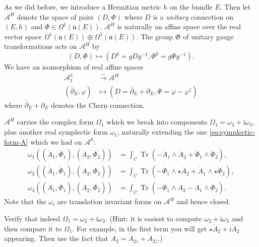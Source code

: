 \documentclass[12pt,letterpaper,reqno]{article}
\numberwithin{equation}{section}
\newcommand{\fu}{{\mathfrak u}}
\newcommand{\fG}{{\mathfrak G}}
\newcommand{\cA}{\ensuremath{\mathcal A}}
\newcommand{\C}{\ensuremath{\mathbb C}}
\newcommand{\I}{{\mathrm i}}
\newcommand{\simarrow}{\xrightarrow\sim}
\newcommand{\ti}[1]{\textit{#1}}
\DeclareMathOperator{\Tr}{Tr}
\begin{document}
As we did before, we introduce a Hermitian metric $h$ on the 
bundle $E$.
Then let $\cA^H$ denote the space
of pairs $(D,\Phi)$ where $D$ is a \ti{unitary} connection on $(E,h)$
and $\Phi \in \Omega^1(\fu(E))$.
$\cA^H$ is naturally an affine space over the real vector space
$\Omega^1(\fu(E)) \oplus \Omega^1(\fu(E))$.
The group $\fG$ of unitary gauge transformations
acts on $\cA^H$ by
\begin{equation}
  (D,\Phi) \mapsto (D^g = g D g^{-1}, \Phi^g = g \Phi g^{-1}).
\end{equation}
We have an isomorphism of real affine spaces
\begin{align}
    \cA^\C_1 &\simarrow \cA^H \\
    (\bar\partial_E,\varphi) & \mapsto (D = \bar\partial_E + \partial_E, \Phi = \varphi - \varphi^\dagger)
\end{align}
where $\bar\partial_E + \partial_E$ denotes the Chern connection.

$\cA^H$ carries the complex form $\Omega_1$ which we break into 
components $\Omega_1 = \omega_2 + \I \omega_3$, plus another 
real symplectic form $\omega_1$, naturally extending the one \eqref{eq:symplectic-form-A} which 
we had on $\cA^h$:
\begin{align}
  \omega_1((\dot A_1, \dot \Phi_1),(\dot A_2, \dot \Phi_2)) &= \int_C \Tr(- \dot A_1 \wedge \dot A_2 + \dot \Phi_1 \wedge \dot \Phi_2), \\
  \omega_2((\dot A_1, \dot \Phi_1),(\dot A_2, \dot \Phi_2)) &= \int_C \Tr(- \dot \Phi_1 \wedge \star \dot A_2 + \dot A_1 \wedge \star \dot \Phi_2), \\
  \omega_3((\dot A_1, \dot \Phi_1),(\dot A_2, \dot \Phi_2)) &= \int_C \Tr(- \dot\Phi_1 \wedge \dot A_2 - \dot A_1 \wedge \dot \Phi_2).
\end{align}
Note that the $\omega_i$ are translation invariant forms on $\cA^H$ and hence
closed.

\begin{exercise} Verify that indeed $\Omega_1 = \omega_2 + \I \omega_3$. (Hint: it is
easiest to compute $\omega_2 + \I \omega_3$ and then compare it to $\Omega_1$.
For example, in the first term you will get $\star \dot{A}_2 + \I \dot{A}_2$ appearing.
Then use the fact that $\dot{A}_2 = \dot{A}_{2z} + \dot{A}_{2\bar{z}}$.)
\end{exercise}
\end{document}
